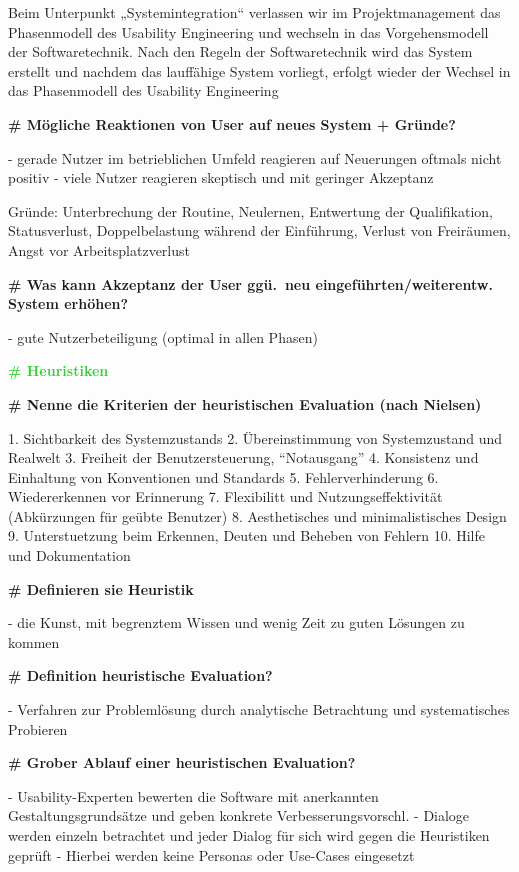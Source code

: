 \documentclass{article}
\begin{document}
\begin{multicols}{3}
\begin{flushleft}
\begin{tiny}
			Beim Unterpunkt „Systemintegration“ verlassen wir im
			Projektmanagement das Phasenmodell des Usability Engineering und
			wechseln in das Vorgehensmodell der Softwaretechnik. Nach den
			Regeln der Softwaretechnik wird das System erstellt und nachdem das
			lauffähige System vorliegt, erfolgt wieder der Wechsel in das
			Phasenmodell des Usability Engineering

			\textbf{\# Mögliche Reaktionen von User auf neues System + Gründe?}

			- gerade Nutzer im betrieblichen Umfeld reagieren auf Neuerungen
			  oftmals nicht positiv
			- viele Nutzer reagieren skeptisch und mit geringer Akzeptanz

			Gründe:
			Unterbrechung der Routine, Neulernen, Entwertung der Qualifikation,
			Statusverlust, Doppelbelastung während der Einführung, Verlust von
			Freiräumen, Angst vor Arbeitsplatzverlust

			\textbf{\# Was kann Akzeptanz der User ggü.\ neu
			eingeführten/weiterentw. System erhöhen?}

			- gute Nutzerbeteiligung (optimal in allen Phasen)

			\textcolor{LimeGreen}{\textbf{\scriptsize{\# Heuristiken}}}

			\textbf{\# Nenne die Kriterien der heuristischen Evaluation (nach
				Nielsen)}

			1. Sichtbarkeit des Systemzustands
			2. Übereinstimmung von Systemzustand und Realwelt
			3. Freiheit der Benutzersteuerung, ``Notausgang''
			4. Konsistenz und Einhaltung von Konventionen und Standards
			5. Fehlerverhinderung
			6. Wiedererkennen vor Erinnerung
			7. Flexibilitt und Nutzungseffektivität (Abkürzungen für geübte
			   Benutzer)
			8. Aesthetisches und minimalistisches Design
			9. Unterstuetzung beim Erkennen, Deuten und Beheben von Fehlern
			10. Hilfe und Dokumentation

			\textbf{\# Definieren sie Heuristik}

			- die Kunst, mit begrenztem Wissen und wenig Zeit zu guten Lösungen
			  zu kommen

			\textbf{\# Definition heuristische Evaluation?}

			- Verfahren zur Problemlösung durch analytische Betrachtung und
			  systematisches Probieren

			\textbf{\# Grober Ablauf einer heuristischen Evaluation?}

			- Usability-Experten bewerten die Software mit anerkannten
			  Gestaltungsgrundsätze und geben konkrete Verbesserungsvorschl.
			- Dialoge werden einzeln betrachtet und jeder Dialog für sich wird
			  gegen die Heuristiken geprüft - Hierbei werden keine Personas
			  oder Use-Cases eingesetzt


\end{tiny}
\end{flushleft}
\end{multicols}
\end{document}
